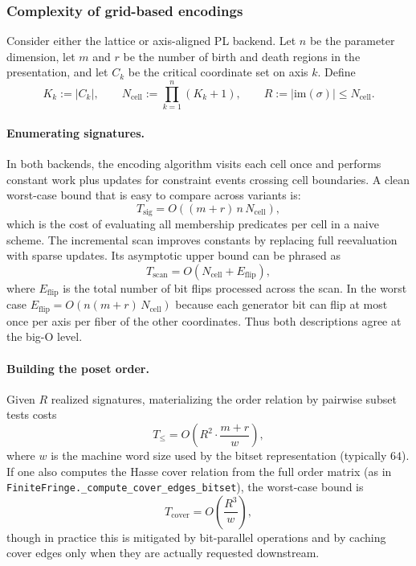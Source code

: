 \documentclass{article}
\newcommand{\<}{\langle}
\renewcommand{\>}{\rangle}
\theoremstyle{definition}
\theoremstyle{remark}
\begin{document}
	\subsubsection*{Complexity of grid-based encodings}
	
	Consider either the lattice or axis-aligned PL backend.
	Let $n$ be the parameter dimension, let $m$ and $r$ be the number of birth and death
	regions in the presentation, and let $C_k$ be the critical coordinate set on axis $k$.
	Define
	\[
	K_k := |C_k|,\qquad
	N_{\mathrm{cell}} := \prod_{k=1}^n (K_k+1),\qquad
	R := |\mathrm{im}(\sigma)|\le N_{\mathrm{cell}}.
	\]
	
	\paragraph{Enumerating signatures.}
	In both backends, the encoding algorithm visits each cell once and performs constant
	work plus updates for constraint events crossing cell boundaries.
	A clean worst-case bound that is easy to compare across variants is:
	\[
	T_{\mathrm{sig}} = O\!\left((m+r)\,n\,N_{\mathrm{cell}}\right),
	\]
	which is the cost of evaluating all membership predicates per cell in a naive scheme.
	The incremental scan improves constants by replacing full reevaluation with sparse
	updates.  Its asymptotic upper bound can be phrased as
	\[
	T_{\mathrm{scan}} = O\!\left(N_{\mathrm{cell}} + E_{\mathrm{flip}}\right),
	\]
	where $E_{\mathrm{flip}}$ is the total number of bit flips processed across the scan.
	In the worst case $E_{\mathrm{flip}} = O(n(m+r)\,N_{\mathrm{cell}})$ because each
	generator bit can flip at most once per axis per fiber of the other coordinates.
	Thus both descriptions agree at the big-O level.
	
	\paragraph{Building the poset order.}
	Given $R$ realized signatures, materializing the order relation by pairwise subset
	tests costs
	\[
	T_{\le} = O\!\left(R^2\cdot \frac{m+r}{w}\right),
	\]
	where $w$ is the machine word size used by the bitset representation (typically $64$).
	If one also computes the Hasse cover relation from the full order matrix (as in
	\texttt{FiniteFringe.\_compute\_cover\_edges\_bitset}), the worst-case bound is
	\[
	T_{\mathrm{cover}} = O\!\left(\frac{R^3}{w}\right),
	\]
	though in practice this is mitigated by bit-parallel operations and by caching cover
	edges only when they are actually requested downstream.
	
\end{document}
